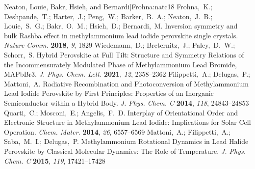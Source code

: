 \documentclass[journal=jpccck,manuscript=article,layout=twocolumn]{achemso}
\begin{document}
\begin{mcitethebibliography}{62}
  Neaton, Louie, Bakr, Hsieh, and Bernardi]{Frohna:natc18}
Frohna,~K.; Deshpande,~T.; Harter,~J.; Peng,~W.; Barker,~B.~A.; Neaton,~J.~B.;
  Louie,~S.~G.; Bakr,~O.~M.; Hsieh,~D.; Bernardi,~M. Inversion symmetry and
  bulk Rashba effect in methylammonium lead iodide perovskite single crystals.
  \emph{Nature Comm.} \textbf{2018}, \emph{9}, 1829\relax
\mciteBstWouldAddEndPuncttrue
\mciteSetBstMidEndSepPunct{\mcitedefaultmidpunct}
{\mcitedefaultendpunct}{\mcitedefaultseppunct}\relax
\EndOfBibitem
{}
Wiedemann,~D.; Breternitz,~J.; Paley,~D.~W.; Schorr,~S. Hybrid Perovskite at
  Full Tilt: Structure and Symmetry Relations of the Incommensurately Modulated
  Phase of Methylammonium Lead Bromide, MAPbBr3. \emph{J. Phys. Chem. Lett.}
  \textbf{2021}, \emph{12}, 2358--2362\relax
\mciteBstWouldAddEndPuncttrue
\mciteSetBstMidEndSepPunct{\mcitedefaultmidpunct}
{\mcitedefaultendpunct}{\mcitedefaultseppunct}\relax
\EndOfBibitem
{}
Filippetti,~A.; Delugas,~P.; Mattoni,~A. Radiative Recombination and
  Photoconversion of Methylammonium Lead Iodide Perovskite by First Principles:
  Properties of an Inorganic Semiconductor within a Hybrid Body. \emph{J. Phys.
  Chem. C} \textbf{2014}, \emph{118}, 24843--24853\relax
\mciteBstWouldAddEndPuncttrue
\mciteSetBstMidEndSepPunct{\mcitedefaultmidpunct}
{\mcitedefaultendpunct}{\mcitedefaultseppunct}\relax
\EndOfBibitem
{}
Quarti,~C.; Mosconi,~E.; Angelis,~F.~D. Interplay of Orientational Order and
  Electronic Structure in Methylammonium Lead Iodide: Implications for Solar
  Cell Operation. \emph{Chem. Mater.} \textbf{2014}, \emph{26},
  6557--6569\relax
\mciteBstWouldAddEndPuncttrue
\mciteSetBstMidEndSepPunct{\mcitedefaultmidpunct}
{\mcitedefaultendpunct}{\mcitedefaultseppunct}\relax
\EndOfBibitem
{}
Mattoni,~A.; Filippetti,~A.; Saba,~M.~I.; Delugas,~P. Methylammonium Rotational
  Dynamics in Lead Halide Perovskite by Classical Molecular Dynamics: The Role
  of Temperature. \emph{J. Phys. Chem. C} \textbf{2015}, \emph{119},
  17421--17428\relax
\mciteBstWouldAddEndPuncttrue
\mciteSetBstMidEndSepPunct{\mcitedefaultmidpunct}
{\mcitedefaultendpunct}{\mcitedefaultseppunct}\relax
\EndOfBibitem
{}

\end{mcitethebibliography}
\end{document}
